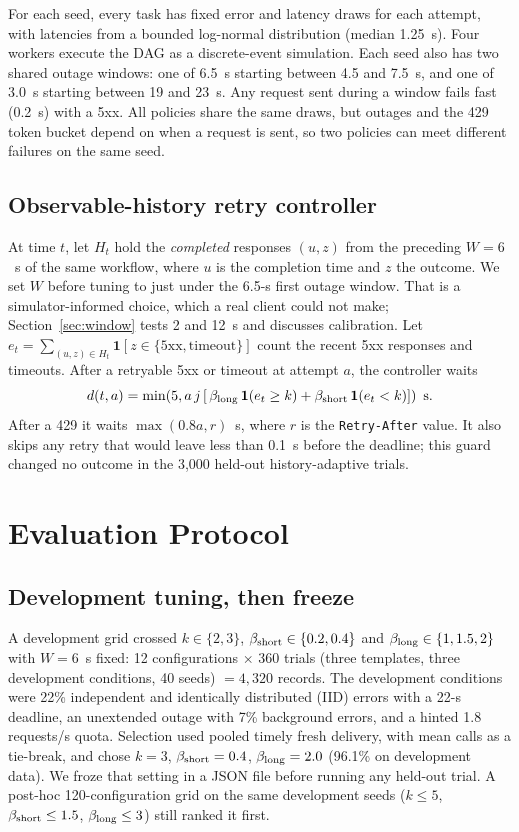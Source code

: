 \documentclass[conference,a4paper]{IEEEtran}
\begin{document}
For each seed, every task has fixed error and latency draws for each attempt, with latencies from a bounded log-normal distribution (median 1.25~s). Four workers execute the DAG as a discrete-event simulation. Each seed also has two shared outage windows: one of 6.5~s starting between 4.5 and 7.5~s, and one of 3.0~s starting between 19 and 23~s. Any request sent during a window fails fast (0.2~s) with a 5xx. All policies share the same draws, but outages and the 429 token bucket depend on when a request is sent, so two policies can meet different failures on the same seed.

\subsection{Observable-history retry controller}
At time $t$, let $H_t$ hold the \emph{completed} responses $(u,z)$ from the preceding $W=6$~s of the same workflow, where $u$ is the completion time and $z$ the outcome. We set $W$ before tuning to just under the 6.5-s first outage window. That is a simulator-informed choice, which a real client could not make; Section~\ref{sec:window} tests 2 and 12~s and discusses calibration. Let $e_t=\sum_{(u,z)\in H_t}\mathbf{1}[z\in\{\mathrm{5xx},\mathrm{timeout}\}]$ count the recent 5xx responses and timeouts. After a retryable 5xx or timeout at attempt $a$, the controller waits
\begin{equation}\label{eq:delay}
d(t,a)=\min\!\left(5, a\,j\left[\,\beta_{\rm long}\,\mathbf{1}(e_t\ge k)+\beta_{\rm short}\,\mathbf{1}(e_t<k)\right]\right)\ \text{s}.
\end{equation}
After a 429 it waits $\max(0.8a,r)$~s, where $r$ is the \texttt{Retry-After} value. It also skips any retry that would leave less than 0.1~s before the deadline; this guard changed no outcome in the 3,000 held-out history-adaptive trials.

\section{Evaluation Protocol}
\subsection{Development tuning, then freeze}
A development grid crossed $k\in\{2,3\}$, $\beta_{\rm short}\in\{0.2,0.4\}$ and $\beta_{\rm long}\in\{1,1.5,2\}$ with $W=6$~s fixed: 12 configurations $\times$ 360 trials (three templates, three development conditions, 40 seeds) $=4{,}320$ records. The development conditions were 22\% independent and identically distributed (IID) errors with a 22-s deadline, an unextended outage with 7\% background errors, and a hinted 1.8 requests/s quota. Selection used pooled timely fresh delivery, with mean calls as a tie-break, and chose $k=3$, $\beta_{\rm short}=0.4$, $\beta_{\rm long}=2.0$ (96.1\% on development data). We froze that setting in a JSON file before running any held-out trial. A post-hoc 120-configuration grid on the same development seeds ($k\le5$, $\beta_{\rm short}\le1.5$, $\beta_{\rm long}\le3$) still ranked it first.
\end{document}
